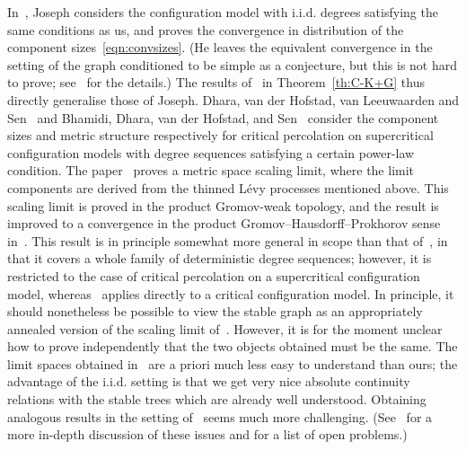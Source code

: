 \documentclass[AHL,Unicode,longabstracts,published]{cedram}
\begin{document}
In~\cite{Joseph14}, Joseph considers the configuration model with i.i.d. degrees satisfying the same conditions as us, and proves the convergence in distribution of the component sizes~\eqref{eqn:convsizes}. (He leaves the equivalent convergence in the setting of the graph conditioned to be simple as a conjecture, but this is not hard to prove; see~\cite{CKG17+} for the details.) The results of~\cite{CKG17+} in Theorem~\ref{th:C-K+G} thus directly generalise those of Joseph. Dhara, van der Hofstad, van Leeuwaarden and Sen~\cite{DvdHvLS16} and Bhamidi, Dhara, van der Hofstad, and Sen~\cite{BhDhvdHSen2020,BDvdHS17} consider the component sizes and metric structure respectively for critical percolation on supercritical configuration models with degree sequences satisfying a certain power-law condition. The paper~\cite{BDvdHS17} proves a metric space scaling limit, where the limit components are derived from the thinned Lévy processes mentioned above. This scaling limit is proved in the product Gromov-weak topology, and the result is improved to a convergence in the product Gromov--Hausdorff--Prokhorov sense in~\cite{BhDhvdHSen2020}. This result is in principle somewhat more general in scope than that of~\cite{CKG17+}, in that it covers a whole family of deterministic degree sequences; however, it is restricted to the case of critical percolation on a supercritical configuration model, whereas~\cite{CKG17+} applies directly to a critical configuration model. In principle, it should nonetheless be possible to view the stable graph as an appropriately annealed version of the scaling limit of~\cite{BDvdHS17}. However, it is for the moment unclear how to prove independently that the two objects obtained must be the same. The limit spaces obtained in~\cite{BDvdHS17} are a priori much less easy to understand than ours; the advantage of the i.i.d. setting is that we get very nice absolute continuity relations with the stable trees which are already well understood. Obtaining analogous results in the setting of~\cite{BDvdHS17} seems much more challenging. (See~\cite{CKG17+} for a more in-depth discussion of these issues and for a list of open problems.)
\end{document}

